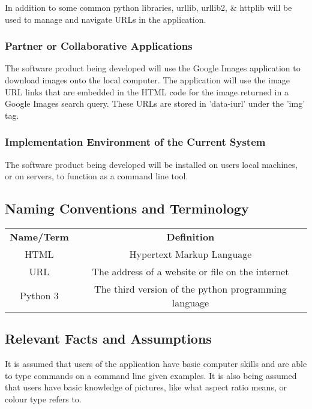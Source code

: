 \documentclass[12pt, titlepage]{article}
\begin{document}
In addition to some common python libraries, urllib, urllib2, \& httplib will be used to manage and navigate URLs in the application.

\subsubsection{Partner or Collaborative Applications}

The software product being developed will use the Google Images application to download images onto the local computer. The application will use the image URL links that are embedded in the HTML code for the image returned in a Google Images search query. These URLs are stored in 'data-iurl' under the 'img' tag.

\subsubsection{Implementation Environment of the Current System}

The software product being developed will be installed on users local machines, or on servers, to function as a command line tool.

\subsection{Naming Conventions and Terminology}

\begin{center}
\begin{tabular}{ |c|c| } 
 \hline
 \textbf{Name/Term} & \textbf{Definition}\\ 
 HTML & Hypertext Markup Language \\ 
 URL & The address of a website or file on the internet \\ 
 Python 3 & The third version of the python programming language \\
 
 \hline
\end{tabular}
\end{center}

\subsection{Relevant Facts and Assumptions}

It is assumed that users of the application have basic computer skills and are able to type commands on a command line given examples. It is also being assumed that users have basic knowledge of pictures, like what aspect ratio means, or colour type refers to.
\end{document}
